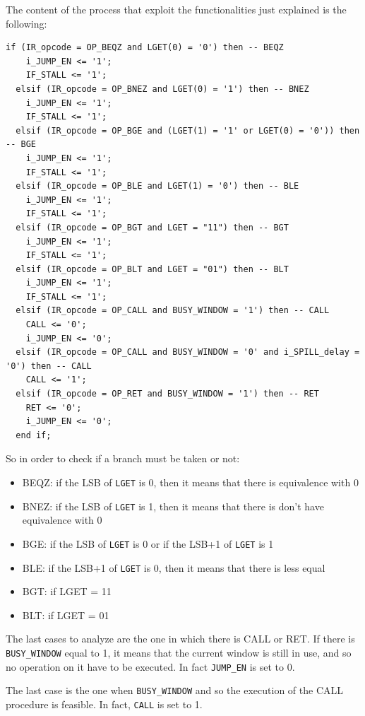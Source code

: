 The content of the process that exploit the functionalities just explained is the following:
\newline

\begin{lstlisting}[style=vhdl,caption={VHDL code for the conditional branch},label=conditional_branches_code]
  if (IR_opcode = OP_BEQZ and LGET(0) = '0') then -- BEQZ 
    i_JUMP_EN <= '1';
    IF_STALL <= '1';
  elsif (IR_opcode = OP_BNEZ and LGET(0) = '1') then -- BNEZ
    i_JUMP_EN <= '1';
    IF_STALL <= '1';
  elsif (IR_opcode = OP_BGE and (LGET(1) = '1' or LGET(0) = '0')) then -- BGE
    i_JUMP_EN <= '1';
    IF_STALL <= '1';
  elsif (IR_opcode = OP_BLE and LGET(1) = '0') then -- BLE
    i_JUMP_EN <= '1';
    IF_STALL <= '1';
  elsif (IR_opcode = OP_BGT and LGET = "11") then -- BGT
    i_JUMP_EN <= '1';
    IF_STALL <= '1';
  elsif (IR_opcode = OP_BLT and LGET = "01") then -- BLT
    i_JUMP_EN <= '1';
    IF_STALL <= '1';
  elsif (IR_opcode = OP_CALL and BUSY_WINDOW = '1') then -- CALL
    CALL <= '0';
    i_JUMP_EN <= '0';	
  elsif (IR_opcode = OP_CALL and BUSY_WINDOW = '0' and i_SPILL_delay = '0') then -- CALL
    CALL <= '1';
  elsif (IR_opcode = OP_RET and BUSY_WINDOW = '1') then -- RET
    RET <= '0';
    i_JUMP_EN <= '0';
  end if;
\end{lstlisting}

So in order to check if a branch must be taken or not:
\begin{itemize}
  \item BEQZ: if the LSB of \texttt{LGET} is 0, then it means that there is equivalence with 0
  \item BNEZ: if the LSB of \texttt{LGET} is 1, then it means that there is don't have equivalence with 0
  \item BGE: if the LSB of \texttt{LGET} is 0 or if the LSB+1 of \texttt{LGET} is 1
  \item BLE: if the LSB+1 of \texttt{LGET} is 0, then it means that there is less equal
  \item BGT: if LGET = 11
  \item BLT: if LGET = 01
\end{itemize}

The last cases to analyze are the one in which there is CALL or RET. If there is \texttt{BUSY\_WINDOW} equal to 1, it means that the current window is still in use, and so no operation on it have to be executed. In fact \texttt{JUMP\_EN} is set to 0.

The last case is the one when \texttt{BUSY\_WINDOW} and so the execution of the CALL procedure is feasible. In fact, \texttt{CALL} is set to 1.


